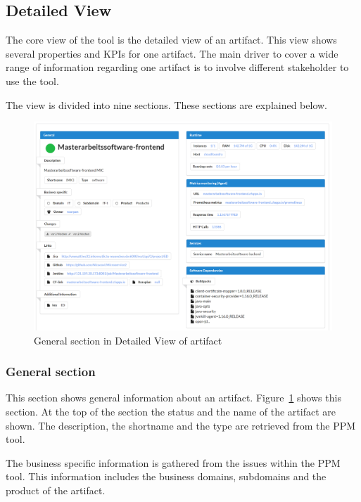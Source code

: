 \subsection{Detailed View}\label{subsection:detailedview}

The core view of the tool is the detailed view of an artifact. This view shows several properties and KPIs for one artifact. The main driver to cover a wide range of information regarding one artifact is to involve different stakeholder to use the tool.

The view is divided into nine sections. These sections are explained below.

\begin{figure}[htpb]
  \centering
  \includegraphics[width=1.0\textwidth]{figures/pivio-detailview-general.PNG} \caption{General section in Detailed View of artifact}
  \label{fig:pivio-detailedview-general}
\end{figure}

\subsubsection{General section}

This section shows general information about an artifact. Figure~\ref{fig:pivio-detailedview-general} shows this section. At the top of the section the status and the name of the artifact are shown. The description, the shortname and the type are retrieved from the PPM tool. 

The business specific information is gathered from the issues within the PPM tool. This information includes the business domains, subdomains and the product of the artifact. 


